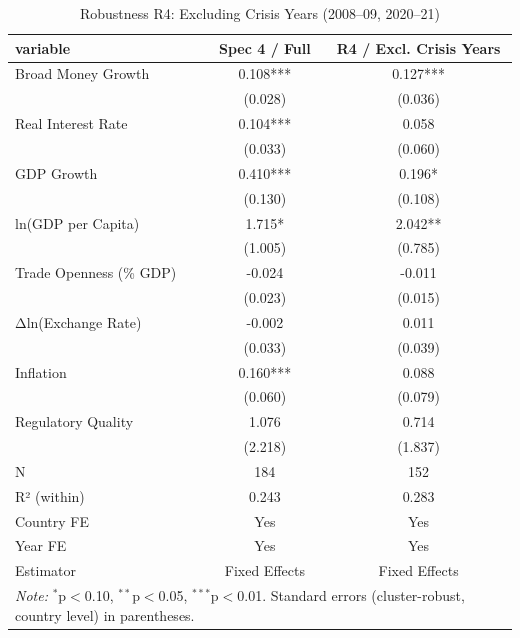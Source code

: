 \begin{table}[htbp]
\centering
\caption{Robustness R4: Excluding Crisis Years (2008–09, 2020–21)}
\label{tab:robustness_r4_crisis}
\begin{tabular}{lcc}
\hline\hline
variable & Spec 4 / Full & R4 / Excl. Crisis Years \\
\hline
Broad Money Growth & 0.108*** & 0.127*** \\
 & (0.028) & (0.036) \\
Real Interest Rate & 0.104*** & 0.058 \\
 & (0.033) & (0.060) \\
GDP Growth & 0.410*** & 0.196* \\
 & (0.130) & (0.108) \\
ln(GDP per Capita) & 1.715* & 2.042** \\
 & (1.005) & (0.785) \\
Trade Openness (\% GDP) & -0.024 & -0.011 \\
 & (0.023) & (0.015) \\
Δln(Exchange Rate) & -0.002 & 0.011 \\
 & (0.033) & (0.039) \\
Inflation & 0.160*** & 0.088 \\
 & (0.060) & (0.079) \\
Regulatory Quality & 1.076 & 0.714 \\
 & (2.218) & (1.837) \\
\hline
N & 184 & 152 \\
R² (within) & 0.243 & 0.283 \\
Country FE & Yes & Yes \\
Year FE & Yes & Yes \\
Estimator & Fixed Effects & Fixed Effects \\
\hline\hline
\multicolumn{3}{l}{\textit{Note:} $^{*}$p$<$0.10, $^{**}$p$<$0.05, $^{***}$p$<$0.01. Standard errors (cluster-robust, country level) in parentheses.}
\end{tabular}
\end{table}